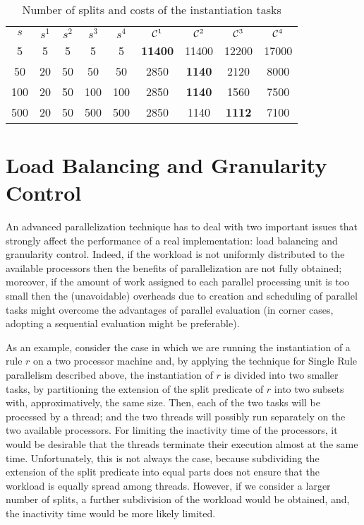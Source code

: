 \documentclass[preprint]{tlp}
\begin{document}
\begin{table}
\small
\caption{Number of splits and costs of the instantiation tasks}
\label{funValues}
\begin{tabular}{| c | c | c | c | c | c | c | c | c |}
 \cline{1-9}
$s$ &  $s^1$ &  $s^2$ & $s^3$ &  $s^4$  & ${\cal C}^1$ & ${\cal C}^2$  &${\cal C}^3$ & ${\cal C}^4$ \\
 \cline{1-9}
5 & 5 & 5 & 5 & 5& \bf{11400}  & 11400  & 12200 & 17000 \\
50 & 20 & 50 & 50 & 50 & 2850 & \bf{1140} & 2120 & 8000 \\
100 & 20 & 50 & 100 & 100 & 2850 &  \bf{1140} & 1560 & 7500 \\
500 & 20 & 50 & 500 & 500 & 2850  & 1140  &\bf{1112} & 7100 \\
\cline{1-9}
\end{tabular}

\end{table}


\section{Load Balancing and Granularity Control} \label{sec:loadB}
An advanced parallelization technique has to deal with two important issues that
strongly affect the performance of a real implementation: load balancing and granularity control.
Indeed, if the workload is not uniformly distributed to the available processors
then the benefits of parallelization are not fully obtained; moreover, if the
amount of work assigned to each parallel processing unit is too small then
the (unavoidable) overheads due to creation and scheduling of parallel tasks
might overcome the advantages of parallel evaluation (in corner cases, adopting
a sequential evaluation might be preferable).

As an example, consider the case in which we are running the instantiation of a rule $r$ on a two
processor machine and,
 by applying the technique for Single Rule parallelism described above,
 the instantiation of $r$ is divided into two smaller tasks, by partitioning
 the extension of the split predicate of $r$ into two subsets with,
 approximatively, the same size.
Then, each of the two tasks will be processed by a thread; and the two
threads will possibly run separately on the two available
processors. For limiting the inactivity time of the processors, it
would be desirable that the threads terminate their execution almost
at the same time. Unfortunately, this is not always the
case, because subdividing the extension of the split predicate into
equal parts does not ensure that the workload is equally spread
among threads. However, if we consider a larger number of splits,
a further subdivision of the workload would be obtained, and, the inactivity
time would be more likely limited.
\end{document}
